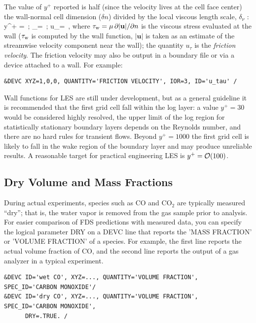 \documentclass[11pt]{book}
\begin{document}
\noindent
The value of $y^+$ reported is half (since the velocity lives at the cell face center) the wall-normal cell dimension ($\delta n$) divided by the local viscous length scale, $\delta_\nu$ \cite{Pope:2000}:
\be
y^+ =   \,\mbox{;} \quad\quad \delta_\nu =  \,\mbox{;} \quad\quad u_\tau =  \,\mbox{,}
\ee
where $\tau_{\rm w} = \mu\,\partial |\mathbf{u}|/\partial n$ is the viscous stress evaluated at the wall ($\tau_{\rm w}$ is computed by the wall function, $|\mathbf{u}|$ is taken as an estimate of the streamwise velocity component near the wall); the quantity $u_\tau$ is the \emph{friction velocity}.  The friction velocity may also be output in a boundary file or via a device attached to a wall.  For example:
\begin{lstlisting}
&DEVC XYZ=1,0,0, QUANTITY='FRICTION VELOCITY', IOR=3, ID='u_tau' /
\end{lstlisting}

\noindent Wall functions for LES are still under development, but as a general guideline it is recommended that the first grid cell fall within the log layer: a value $y^+=30$ would be considered highly resolved, the upper limit of the log region for statistically stationary boundary layers depends on the Reynolds number, and there are no hard rules for transient flows.  Beyond $y^+=1000$ the first grid cell is likely to fall in the wake region of the boundary layer and may produce unreliable results.  A reasonable target for practical engineering LES is $y^+ = {\cal O}(100)$.

\subsection{Dry Volume and Mass Fractions}
\label{info:dry}

During actual experiments, species such as CO and CO$_2$ are typically measured ``dry''; that is, the water
vapor is removed from the gas sample prior to analysis.  For easier comparison of FDS predictions with measured data,
you can specify the logical parameter {\ct DRY} on a {\ct DEVC} line that reports the {\ct 'MASS FRACTION'} or
{\ct 'VOLUME FRACTION'} of a species.  For example, the first line reports
the actual volume fraction of CO, and the second line reports the output of a gas analyzer in a typical experiment.

\begin{lstlisting}
&DEVC ID='wet CO', XYZ=..., QUANTITY='VOLUME FRACTION', SPEC_ID='CARBON MONOXIDE'/
&DEVC ID='dry CO', XYZ=..., QUANTITY='VOLUME FRACTION', SPEC_ID='CARBON MONOXIDE',
      DRY=.TRUE. /
\end{lstlisting}
\end{document}
